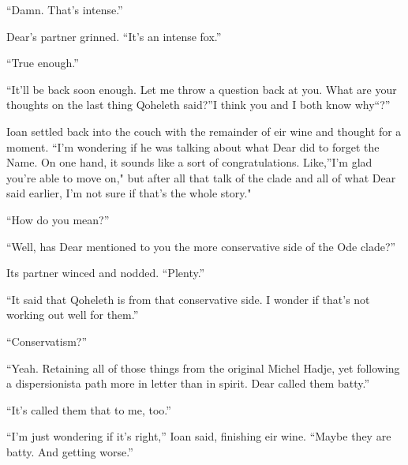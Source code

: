 ``Damn. That's intense.''

Dear's partner grinned. ``It's an intense fox.''

``True enough.''

``It'll be back soon enough. Let me throw a question back at you. What are your thoughts on the last thing Qoheleth said?''I think you and I both know why``?''

Ioan settled back into the couch with the remainder of eir wine and thought for a moment. ``I'm wondering if he was talking about what Dear did to forget the Name. On one hand, it sounds like a sort of congratulations. Like,''I'm glad you're able to move on," but after all that talk of the clade and all of what Dear said earlier, I'm not sure if that's the whole story."

``How do you mean?''

``Well, has Dear mentioned to you the more conservative side of the Ode clade?''

Its partner winced and nodded. ``Plenty.''

``It said that Qoheleth is from that conservative side. I wonder if that's not working out well for them.''

``Conservatism?''

``Yeah. Retaining all of those things from the original Michel Hadje, yet following a dispersionista path more in letter than in spirit. Dear called them batty.''

``It's called them that to me, too.''

``I'm just wondering if it's right,'' Ioan said, finishing eir wine. ``Maybe they are batty. And getting worse.''
